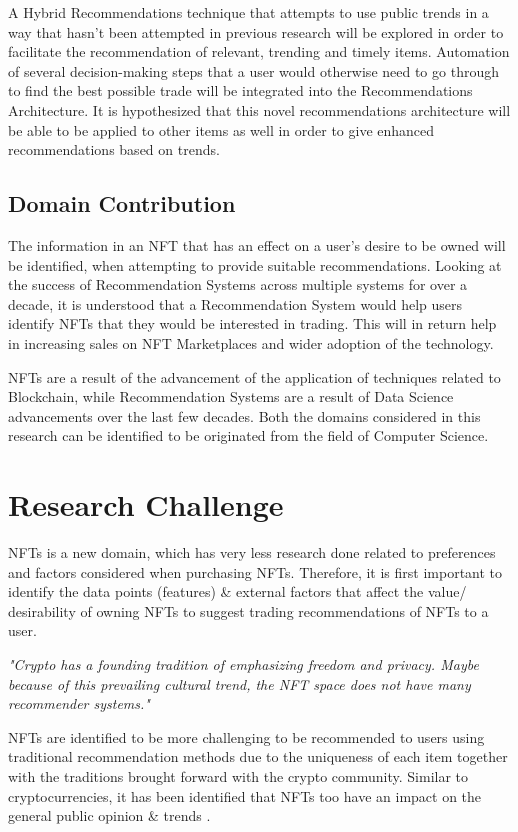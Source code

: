 \documentclass[a4paper, 12pt, oneside]{report}
\begin{document}
A Hybrid Recommendations technique that attempts to use public trends in a way that hasn't been attempted in previous research will be explored in order to facilitate the recommendation of relevant, trending and timely items. Automation of several decision-making steps that a user would otherwise need to go through to find the best possible trade will be integrated into the Recommendations Architecture. It is hypothesized that this novel recommendations architecture will be able to be applied to other items as well in order to give enhanced recommendations based on trends.

\section{Domain Contribution}

The information in an NFT that has an effect on a user's desire to be owned will be identified, when attempting to provide suitable recommendations.
Looking at the success of Recommendation Systems across multiple systems for over a decade, it is understood that a Recommendation System would help users identify NFTs that they would be interested in trading. This will in return help in increasing sales on NFT Marketplaces and wider adoption of the technology.

\bigbreak
NFTs are a result of the advancement of the application of techniques related to Blockchain, while Recommendation Systems are a result of Data Science advancements over the last few decades. Both the domains considered in this research can be identified to be originated from the field of Computer Science.


\chapter{Research Challenge}
NFTs is a new domain, which has very less research done related to preferences and factors considered when purchasing NFTs.
Therefore, it is first important to identify the data points (features) \& external factors that affect the value/ desirability of owning NFTs to suggest trading recommendations of NFTs to a user.

\bigbreak
\textit{"Crypto has a founding tradition of emphasizing freedom and privacy. Maybe because of this prevailing cultural trend, the NFT space does not have many recommender systems."} \autocite{noauthor_what_2020}

NFTs are identified to be more challenging to be recommended to users using traditional recommendation methods due to the uniqueness of each item together with the traditions brought forward with the crypto community.
Similar to cryptocurrencies, it has been identified that NFTs too have an impact on the general public opinion \& trends \autocite{dowling_fertile_2021}.
\end{document}
